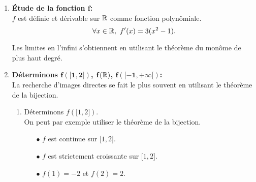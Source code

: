 \documentclass[a4paper, 11pt,reqno]{article}
\begin{document}
\begin{correction} \;
	\begin{enumerate}
		\item \textbf{\'Etude de la fonction $\mathbf{f}$:}\\
		      \noindent $f$ est d\'efinie et d\'erivable sur $\mathbb{R}$ comme fonction polyn\^omiale.
		      $$\forall x\in \R,\ f^{\prime}(x)=3(x^2-1).$$
		      \begin{center}
		      \end{center}
		      Les limites en l'infini s'obtiennent en utilisant le th\'eor\`{e}me du mon\^{o}me de plus haut degr\'e.
		\item \textbf{D\'eterminons $\mathbf{f(\lbrack 1,2\rbrack)}$, $\mathbf{f(\mathbb{R})}$, $\mathbf{f(\lbrack -1,+\infty\lbrack)}$:}\\
		      \noindent
		      La recherche d'images directes se fait le plus souvent en utilisant le th\'eor\`{e}me de la bijection.
		      \begin{enumerate}
			      \item D\'eterminons $f(\lbrack 1,2\rbrack)$.\\
			            \noindent On peut par exemple utiliser le th\'eor\`eme de la bijection.
			            \begin{itemize}
				            \item[$\bullet$] $f$ est continue sur $\lbrack 1,2\rbrack$.
				            \item[$\bullet$]  $f$ est strictement croissante sur $\lbrack 1,2\rbrack$.
				            \item[$\bullet$] $f(1)=-2$ et $f(2)=2$.
			            \end{itemize}

\end{enumerate}
\end{enumerate}
\end{correction}
\end{document}
